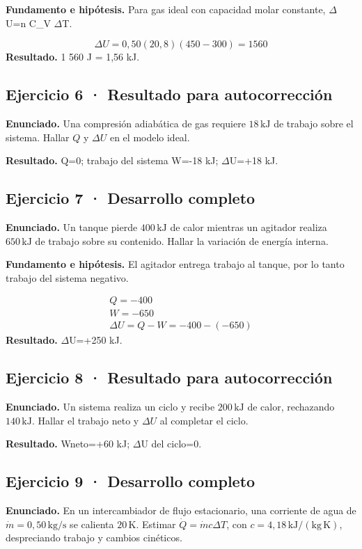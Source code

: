 \documentclass[11pt,a4paper]{article}
\begin{document}
\textbf{Fundamento e hipótesis.} Para gas ideal con capacidad molar constante, \ensuremath{\Delta}U=n C\_V \ensuremath{\Delta}T.

\[
\Delta U=0{,}50(20{,}8)(450-300)=1560
\]
\textbf{Resultado.} 1 560 J = 1,56 kJ.


\subsection*{Ejercicio 6 · Resultado para autocorrección}
\textbf{Enunciado.} Una compresión adiabática de gas requiere \(18\,\mathrm{kJ}\) de trabajo sobre el sistema. Hallar \(Q\) y \(\Delta U\) en el modelo ideal.

\textbf{Resultado.} Q=0; trabajo del sistema W=-18 kJ; \ensuremath{\Delta}U=+18 kJ.


\subsection*{Ejercicio 7 · Desarrollo completo}
\textbf{Enunciado.} Un tanque pierde \(400\,\mathrm{kJ}\) de calor mientras un agitador realiza \(650\,\mathrm{kJ}\) de trabajo sobre su contenido. Hallar la variación de energía interna.

\textbf{Fundamento e hipótesis.} El agitador entrega trabajo al tanque, por lo tanto trabajo del sistema negativo.

\[
\begin{gathered}
Q=-400\\W=-650\\\Delta U=Q-W=-400-(-650)
\end{gathered}
\]
\textbf{Resultado.} \ensuremath{\Delta}U=+250 kJ.


\subsection*{Ejercicio 8 · Resultado para autocorrección}
\textbf{Enunciado.} Un sistema realiza un ciclo y recibe \(200\,\mathrm{kJ}\) de calor, rechazando \(140\,\mathrm{kJ}\). Hallar el trabajo neto y \(\Delta U\) al completar el ciclo.

\textbf{Resultado.} Wneto=+60 kJ; \ensuremath{\Delta}U del ciclo=0.


\subsection*{Ejercicio 9 · Desarrollo completo}
\textbf{Enunciado.} En un intercambiador de flujo estacionario, una corriente de agua de \(\dot m=0{,}50\,\mathrm{kg/s}\) se calienta \(20\,\mathrm K\). Estimar \(\dot Q=\dot mc\Delta T\), con \(c=4{,}18\,\mathrm{kJ/(kg\,K)}\), despreciando trabajo y cambios cinéticos.
\end{document}

